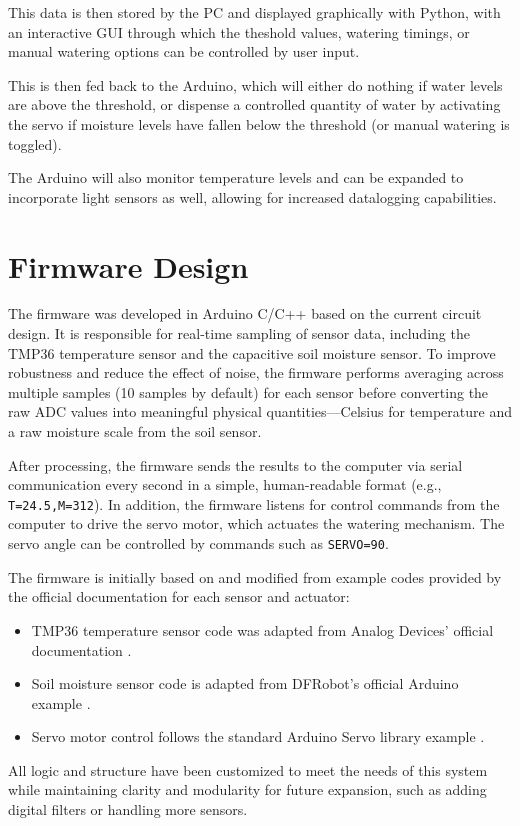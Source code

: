 \documentclass[a4paper,11pt]{article}
\begin{document}
This data is then stored by the PC and displayed graphically with Python, 
with an interactive GUI through which the 
theshold values, watering timings, or manual watering options
can be controlled by user input.

This is then fed back to the Arduino, 
which will either do nothing if water levels are above the threshold,
or dispense a controlled quantity of water by activating the servo
if moisture levels have fallen below the threshold
(or manual watering is toggled).

The Arduino will also monitor temperature levels and can be expanded to 
incorporate light sensors as well, allowing for increased datalogging capabilities.

\section{Firmware Design}

The firmware was developed in Arduino C/C++ based on the current circuit design. It is responsible for real-time sampling of sensor data, including the TMP36 temperature sensor and the capacitive soil moisture sensor. To improve robustness and reduce the effect of noise, the firmware performs averaging across multiple samples (10 samples by default) for each sensor before converting the raw ADC values into meaningful physical quantities—Celsius for temperature and a raw moisture scale from the soil sensor.

After processing, the firmware sends the results to the computer via serial communication every second in a simple, human-readable format (e.g., \texttt{T=24.5,M=312}). In addition, the firmware listens for control commands from the computer to drive the servo motor, which actuates the watering mechanism. The servo angle can be controlled by commands such as \texttt{SERVO=90}.

The firmware is initially based on and modified from example codes provided by the official documentation for each sensor and actuator:
\begin{itemize}
    \item TMP36 temperature sensor code was adapted from Analog Devices’ official documentation \cite{tmp36}.
    \item Soil moisture sensor code is adapted from DFRobot’s official Arduino example \cite{dfrobot}.
    \item Servo motor control follows the standard Arduino Servo library example \cite{arduino_servo}.
\end{itemize}
All logic and structure have been customized to meet the needs of this system while maintaining clarity and modularity for future expansion, such as adding digital filters or handling more sensors.
\end{document}
